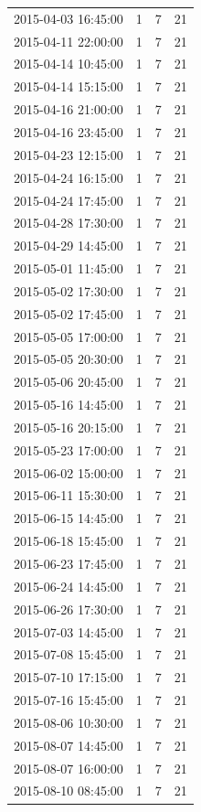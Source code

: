\begin{tabular}{lrrr}
2015-04-03 16:45:00 & 1 & 7 & 21 \\
2015-04-11 22:00:00 & 1 & 7 & 21 \\
2015-04-14 10:45:00 & 1 & 7 & 21 \\
2015-04-14 15:15:00 & 1 & 7 & 21 \\
2015-04-16 21:00:00 & 1 & 7 & 21 \\
2015-04-16 23:45:00 & 1 & 7 & 21 \\
2015-04-23 12:15:00 & 1 & 7 & 21 \\
2015-04-24 16:15:00 & 1 & 7 & 21 \\
2015-04-24 17:45:00 & 1 & 7 & 21 \\
2015-04-28 17:30:00 & 1 & 7 & 21 \\
2015-04-29 14:45:00 & 1 & 7 & 21 \\
2015-05-01 11:45:00 & 1 & 7 & 21 \\
2015-05-02 17:30:00 & 1 & 7 & 21 \\
2015-05-02 17:45:00 & 1 & 7 & 21 \\
2015-05-05 17:00:00 & 1 & 7 & 21 \\
2015-05-05 20:30:00 & 1 & 7 & 21 \\
2015-05-06 20:45:00 & 1 & 7 & 21 \\
2015-05-16 14:45:00 & 1 & 7 & 21 \\
2015-05-16 20:15:00 & 1 & 7 & 21 \\
2015-05-23 17:00:00 & 1 & 7 & 21 \\
2015-06-02 15:00:00 & 1 & 7 & 21 \\
2015-06-11 15:30:00 & 1 & 7 & 21 \\
2015-06-15 14:45:00 & 1 & 7 & 21 \\
2015-06-18 15:45:00 & 1 & 7 & 21 \\
2015-06-23 17:45:00 & 1 & 7 & 21 \\
2015-06-24 14:45:00 & 1 & 7 & 21 \\
2015-06-26 17:30:00 & 1 & 7 & 21 \\
2015-07-03 14:45:00 & 1 & 7 & 21 \\
2015-07-08 15:45:00 & 1 & 7 & 21 \\
2015-07-10 17:15:00 & 1 & 7 & 21 \\
2015-07-16 15:45:00 & 1 & 7 & 21 \\
2015-08-06 10:30:00 & 1 & 7 & 21 \\
2015-08-07 14:45:00 & 1 & 7 & 21 \\
2015-08-07 16:00:00 & 1 & 7 & 21 \\
2015-08-10 08:45:00 & 1 & 7 & 21 \\

\end{tabular}
